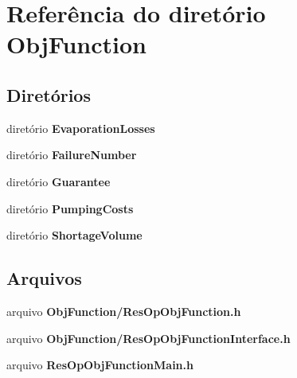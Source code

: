 \section{Referência do diretório Obj\+Function}
\label{dir_21c64b1591dc08ca75131d64345aefa5}
\subsection*{Diretórios}
\begin{DoxyCompactItemize}
\item 
diretório {\bf Evaporation\+Losses}
\item 
diretório {\bf Failure\+Number}
\item 
diretório {\bf Guarantee}
\item 
diretório {\bf Pumping\+Costs}
\item 
diretório {\bf Shortage\+Volume}
\end{DoxyCompactItemize}
\subsection*{Arquivos}
\begin{DoxyCompactItemize}
\item 
arquivo {\bf Obj\+Function/\+Res\+Op\+Obj\+Function.\+h}
\item 
arquivo {\bf Obj\+Function/\+Res\+Op\+Obj\+Function\+Interface.\+h}
\item 
arquivo {\bf Res\+Op\+Obj\+Function\+Main.\+h}
\end{DoxyCompactItemize}
